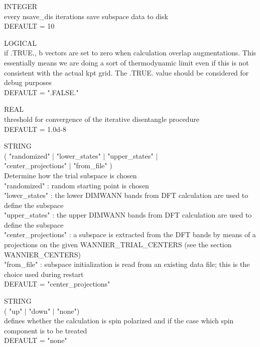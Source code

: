 {\noindent{}%
INTEGER \\  every nsave\_dis iterations save subspace data to disk\\ DEFAULT = 10 \par

\noindent{}%
LOGICAL \\   if .TRUE., b vectors are set to zero when calculation overlap augmentations.
This essentially means we are doing a sort of thermodynamic limit
even if this is not consistent with the actual kpt grid. The .TRUE. value
should be considered for debug purposes\\ DEFAULT = ".FALSE." \par

\noindent{}%
REAL \\  threshold for convergence of the iterative disentangle procedure\\ DEFAULT = 1.0d-8 \par

\noindent{}%
STRING \\  ( "randomized" $\mid$ "lower\_states" $\mid$ "upper\_states" $\mid$ \\
"center\_projections" $\mid$ "from\_file" )\\
Determine how the trial subspace is chosen\\
"randomized"   : random starting point is chosen\\
"lower\_states" : the lower DIMWANN bands from DFT calculation are
                 used to define the subspace\\
"upper\_states" : the upper DIMWANN bands from DFT calculation are
                 used to define the subspace\\
"center\_projections" : a subspace is extracted from the DFT bands
                 by means of a projections on the given WANNIER\_TRIAL\_CENTERS
                 (see the section WANNIER\_CENTERS)\\
"from\_file" : subspace initialization is read from an existing data file;
                 this is the choice used during restart\\
DEFAULT = "center\_projections" \par

\noindent{}%
STRING \\  ( "up" $\mid$ "down" $\mid$ "none")\\
defines whether the calculation is spin polarized and if the case
which spin component is to be treated\\ DEFAULT = "none" \par
}\bigskip

